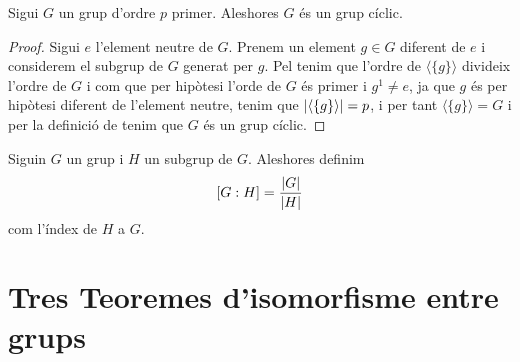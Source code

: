 \documentclass[../../Main.tex]{subfiles}
\begin{document}
	\begin{corollary} %
		Sigui \(G\) un grup d'ordre \(p\) primer. Aleshores \(G\) és un grup cíclic.
		\begin{proof}
			Sigui \(e\) l'element neutre de \(G\). Prenem un element \(g\in G\) diferent de \(e\) i considerem el subgrup de \(G\) generat per \(g\). Pel  tenim que l'ordre de \(\langle\{g\}\rangle\) divideix l'ordre de \(G\) i com que per hipòtesi l'orde de \(G\) és primer i \(g^{1}\neq e\), ja que \(g\) és per hipòtesi diferent de l'element neutre, tenim que \(\abs{\langle\{g\}\rangle}=p\), i per tant \(\langle\{g\}\rangle=G\) i per la definició de  tenim que \(G\) és un grup cíclic.
		\end{proof}
	\end{corollary}
	\begin{definition}
		\label{def:l'índex d'un subgrup en un grup}
		Siguin \(G\) un grup i \(H\) un subgrup de \(G\). Aleshores definim
		\[[G:H]=\frac{\abs{G}}{\abs{H}}\]
		com l'índex de \(H\) a \(G\).
	\end{definition}
\section{Tres Teoremes d'isomorfisme entre grups}
\end{document}

